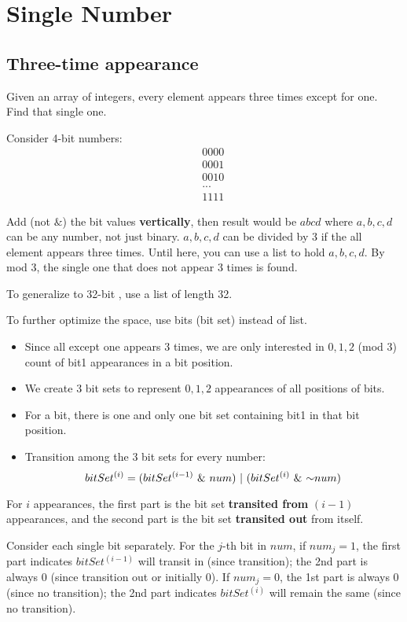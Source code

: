 \section{Single Number}
\subsection{Three-time appearance} 
Given an array of integers, every element appears three times except for one. Find that single one.

 Consider 4-bit numbers:
\begin{eqnarray*}
&& 0000 \\
&& 0001 \\
&& 0010 \\
&& ... \\
&& 1111
\end{eqnarray*}

Add (not $\&$) the bit values \textbf{vertically}, then result would be $abcd$ where $a, b, c, d$ can be any number, not just binary. $a, b, c, d$ can be divided by 3 if the all element appears three times. Until here, you can use a list to hold $a, b, c, d$. By mod 3, the single one that does not appear 3 times is found. 

To generalize to 32-bit , use a list of length 32.

To further optimize the space, use bits (bit set) instead of list. 
\begin{itemize}
\item Since all except one appears 3 times, we are only interested in $0, 1, 2$ (mod 3) count of bit1 appearances in a bit position.
\item We create 3 bit sets to represent $0, 1, 2$ appearances of all positions of bits.
\item For a bit, there is one and only one bit set containing bit1 in that bit position.
\item Transition among the 3 bit sets for every number:
$$
bitSet^{(i)} = (bitSet^{(i-1)}\ \&\  num)\ |\ (bitSet^{(i)}\ \&\  \mathord{\sim} num)
$$
\end{itemize}

For $i$ appearances, the first part is the bit set \textbf{transited from} $(i-1)$ appearances, and the second part is the bit set \textbf{transited out} from itself.

Consider each single bit separately. For the $j$-th bit in $num$, if $num_j=1$, the first part indicates $bitSet^{(i-1)}$ will transit in (since transition); the 2nd part is always 0 (since transition out or initially 0). If $num_j=0$, the 1st part is always 0 (since no transition); the 2nd part indicates $bitSet^{(i)}$ will remain the same (since no transition). 



